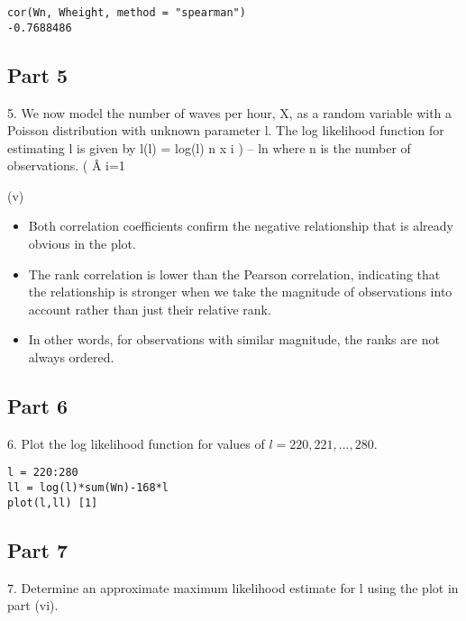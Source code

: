 \documentclass[a4paper,12pt]{article}
\begin{document}
\begin{framed}\begin{verbatim}
cor(Wn, Wheight, method = "spearman")
-0.7688486 
\end{verbatim}\end{framed}




\subsection*{Part 5}
5. We now model the number of waves per hour, X, as a random variable with a Poisson
distribution with unknown parameter l. The log likelihood function for estimating l
is given by l(l) = log(l)
n
x i ) – ln where n is the number of observations.
( Â i=1

(v)


\begin{itemize}
    \item Both correlation coefficients confirm the negative relationship that is
already obvious in the plot.
    \item The rank correlation is lower than the Pearson correlation, indicating that the relationship is stronger when we take the magnitude of observations into account rather than just their relative rank.
    \item In other words, for observations with similar magnitude, the ranks are not always ordered.
\end{itemize}


\newpage

\subsection*{Part 6}
6. Plot the log likelihood function for values of $l = 220, 221, ..., 280$.

\begin{framed}\begin{verbatim}
l = 220:280
ll = log(l)*sum(Wn)-168*l
plot(l,ll) [1]
\end{verbatim}\end{framed}


\newpage

\subsection*{ Part 7}
7. Determine an approximate maximum likelihood estimate for l using the plot
in part (vi).
\end{document}
